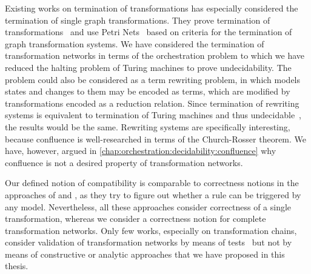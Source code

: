 Existing works on termination of transformations has especially considered the termination of single graph transformations.
They prove termination of transformations~\cite{ehrig2005termination-FASE} and use Petri Nets~\cite{varro2006termination-ICGT} based on criteria for the termination of graph transformation systems.
We have considered the termination of transformation networks in terms of the orchestration problem to which we have reduced the halting problem of Turing machines to prove undecidability.
The problem could also be considered as a term rewriting problem, in which models states and changes to them may be encoded as terms, which are modified by transformations encoded as a reduction relation.
Since termination of rewriting systems is equivalent to termination of Turing machines and thus undecidable~\cite{endrullis2011undecidabilityRewriting-IC}, the results would be the same.
Rewriting systems are specifically interesting, because confluence is well-researched in terms of the Church-Rosser theorem.
We have, however, argued in \autoref{chap:orchestration:decidability:confluence} why confluence is not a desired property of transformation networks.

Our defined notion of compatibility is comparable to correctness notions in the approaches of \textcite{cuadrado2017tse} and \textcite{cabot2010VerificationInvariants-JSS}, as they try to figure out whether a rule can be triggered by any model.
Nevertheless, all these approaches consider correctness of a single transformation, whereas we consider a correctness notion for complete transformation networks.
Only few works, especially on transformation chains, consider validation of transformation networks by means of tests~\cite{bauer2011combiningCoverageChains-ICMT} but not by means of constructive or analytic approaches that we have proposed in this thesis.

